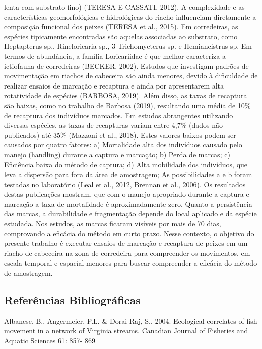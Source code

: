 \documentclass[
]{article}
\begin{document}
lenta com substrato fino) (TERESA E CASSATI, 2012). A complexidade e as
características geomorfológicas e hidrológicas do riacho influenciam
diretamente a composição funcional dos peixes (TERESA et al., 2015). Em
corredeiras, as espécies tipicamente encontradas são aquelas associadas
ao substrato, como Heptapterus sp., Rineloricaria sp., 3 Trichomycterus
sp. e Hemiancistrus sp. Em termos de abundância, a família Loricariidae
é que melhor caracteriza a ictiofauna de corredeiras (BECKER, 2002).
Estudos que investigam padrões de movimentação em riachos de cabeceira
são ainda menores, devido à dificuldade de realizar ensaios de marcação
e recaptura e ainda por apresentarem alta rotatividade de espécies
(BARBOSA, 2019). Além disso, as taxas de recaptura são baixas, como no
trabalho de Barbosa (2019), resultando uma média de 10\% de recaptura
dos indivíduos marcados. Em estudos abrangentes utilizando diversas
espécies, as taxas de recapturas variam entre 4,7\% (dados não
publicados) até 35\% (Mazzoni et al., 2018). Estes valores baixos podem
ser causados por quatro fatores: a) Mortalidade alta dos indivíduos
causado pelo manejo (handling) durante a captura e marcação; b) Perda de
marcas; c) Eficiência baixa do método de captura; d) Alta mobilidade dos
indivíduos, que leva a dispersão para fora da área de amostragem; As
possibilidades a e b foram testadas no laboratório (Leal et al., 2012,
Brennan et al., 2006). Os resultados destas publicações mostram, que com
o manejo apropriado durante a captura e marcação a taxa de mortalidade é
aproximadamente zero. Quanto a persistência das marcas, a durabilidade e
fragmentação depende do local aplicado e da espécie estudada. Nos
estudos, as marcas ficaram visíveis por mais de 70 dias, comprovando a
eficácia do método em curto prazo. Nesse contexto, o objetivo do
presente trabalho é executar ensaios de marcação e recaptura de peixes
em um riacho de cabeceira na zona de corredeira para compreender os
movimentos, em escala temporal e espacial menores para buscar
compreender a eficácia do método de amostragem.

\subsection{Referências
Bibliográficas}\label{referuxeancias-bibliogruxe1ficas}

Albanese, B., Angermeier, P.L. \& Dorai-Raj, S., 2004. Ecological
correlates of fish movement in a network of Virginia streams. Canadian
Journal of Fisheries and Aquatic Sciences 61: 857- 869
\end{document}
